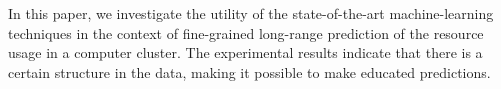 In this paper, we investigate the utility of the state-of-the-art
machine-learning techniques in the context of fine-grained long-range prediction
of the resource usage in a computer cluster. The experimental results indicate
that there is a certain structure in the data, making it possible to make
educated predictions.
